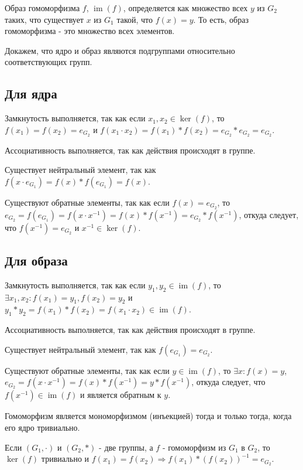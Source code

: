 \documentclass[12pt]{article}
\begin{document}
Образ гомоморфизма $f$, $\operatorname{im}(f)$, определяется как множество всех $y$ из $G_2$ таких, что существует $x$ из $G_1$ такой, что $f(x)=y$. То есть, образ гомоморфизма - это множество всех элементов.

Докажем, что ядро и образ являются подгруппами относительно соответствующих групп.

\subsection{Для ядра}

Замкнутость выполняется, так как если $x_1,x_2\in \operatorname{ker}(f)$, то \\ $f(x_1)=f(x_2)=e_{G_2}$ и $f(x_1\cdot x_2)=f(x_1)*f(x_2)=e_{G_2}*e_{G_2}=e_{G_2}$.

Ассоциативность выполняется, так как действия происходят в группе.

Существует нейтральный элемент, так как $f(x\cdot e_{G_1})=f(x)*f(e_{G_1})=f(x)$.

Существуют обратные элементы, так как если $f(x)=e_{G_2}$, то $e_{G_2}=f(e_{G_1})=f(x\cdot x^{-1})=f(x)*f(x^{-1})=e_{G_2}*f(x^{-1})$, откуда следует, что $f(x^{-1})=e_{G_2}$ и $x^{-1}\in \operatorname{ker}(f)$.

\subsection{Для образа}

Замкнутость выполняется, так как если $y_1,y_2\in \operatorname{im}(f)$, то \\$\exists x_1,x_2:f(x_1)=y_1,f(x_2)=y_2$ и $y_1*y_2=f(x_1)*f(x_2)=f(x_1\cdot x_2)\in \operatorname{im}(f)$.

    Ассоциативность выполняется, так как действия происходят в группе.

    Существует нейтральный элемент, так как $f(e_{G_1})=e_{G_2}$.

    Существуют обратные элементы, так как если $y\in \operatorname{im}(f)$, то $\exists x:f(x)=y$, $e_{G_2}=f(x\cdot x^{-1})=f(x)*f(x^{-1})=y*f(x^{-1})$, откуда следует, что $f(x^{-1})\in \operatorname{im}(f)$ и является обратным к $y$.

    Гомоморфизм является мономорфизмом (инъекцией) тогда и только тогда, когда его ядро тривиально.

    Если $(G_1,\cdot)$ и $(G_2,*)$ - две группы, а $f$ - гомоморфизм из $G_1$ в $G_2$, то $\operatorname{ker}(f)$ тривиально и $f(x_1)=f(x_2)\Rightarrow f(x_1)*(f(x_2))^{-1}=e_{G_2}$.
\end{document}
